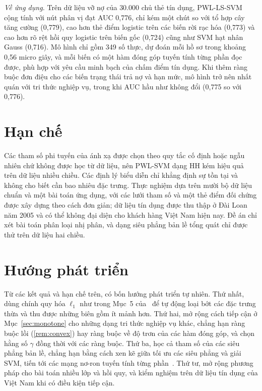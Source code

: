 \emph{Về ứng dụng.} Trên dữ liệu vỡ nợ của $30.000$ chủ thẻ tín dụng, PWL-LS-SVM cộng tính với nút phân vị đạt AUC 0{,}776, chỉ kém một chút so với tổ hợp cây tăng cường (0{,}779), cao hơn thẻ điểm logistic trên các biến rời rạc hóa (0{,}773) và cao hơn rõ rệt hồi quy logistic trên biến gốc (0{,}724) cũng như SVM hạt nhân Gauss (0{,}716). Mô hình chỉ gồm 349 số thực, dự đoán mỗi hồ sơ trong khoảng 0{,}56 micro giây, và mỗi biến có một hàm đóng góp tuyến tính từng phần đọc được, phù hợp với yêu cầu minh bạch của chấm điểm tín dụng. Khi thêm ràng buộc đơn điệu cho các biến trạng thái trả nợ và hạn mức, mô hình trở nên nhất quán với tri thức nghiệp vụ, trong khi AUC hầu như không đổi (0{,}775 so với 0{,}776).

\section*{Hạn chế}

Các tham số phi tuyến của ánh xạ được chọn theo quy tắc cố định hoặc ngẫu nhiên chứ không được học từ dữ liệu, nên PWL-SVM dạng HH kém hiệu quả trên dữ liệu nhiều chiều. Các định lý biểu diễn chỉ khẳng định sự tồn tại và không cho biết cần bao nhiêu đặc trưng. Thực nghiệm dựa trên mười bộ dữ liệu chuẩn và một bài toán ứng dụng, với các lưới tham số và một thẻ điểm đối chứng được xây dựng theo cách đơn giản; dữ liệu tín dụng được thu thập ở Đài Loan năm 2005 và có thể không đại diện cho khách hàng Việt Nam hiện nay. Đề án chỉ xét bài toán phân loại nhị phân, và dạng siêu phẳng bản lề tổng quát chỉ được thử trên dữ liệu hai chiều.

\section*{Hướng phát triển}

Từ các kết quả và hạn chế trên, có bốn hướng phát triển tự nhiên. Thứ nhất, dùng chính quy hóa $\ell_1$ như trong Mục~5 của~\cite{huang2013} để tự động loại bớt các đặc trưng thừa và thu được những biên gồm ít mảnh hơn. Thứ hai, mở rộng cách tiếp cận ở Mục~\ref{sec:monotone} cho những dạng tri thức nghiệp vụ khác, chẳng hạn ràng buộc lồi (\cref{rem:convex}) hay ràng buộc về độ trơn của các hàm đóng góp, và chọn hằng số $\gamma$ đồng thời với các ràng buộc. Thứ ba, học cả tham số của các siêu phẳng bản lề, chẳng hạn bằng cách xen kẽ giữa tối ưu các siêu phẳng và giải SVM, tiến tới các mạng nơ-ron tuyến tính từng phần~\cite{tao2022}. Thứ tư, mở rộng phương pháp cho bài toán nhiều lớp và hồi quy, và kiểm nghiệm trên dữ liệu tín dụng của Việt Nam khi có điều kiện tiếp cận.
